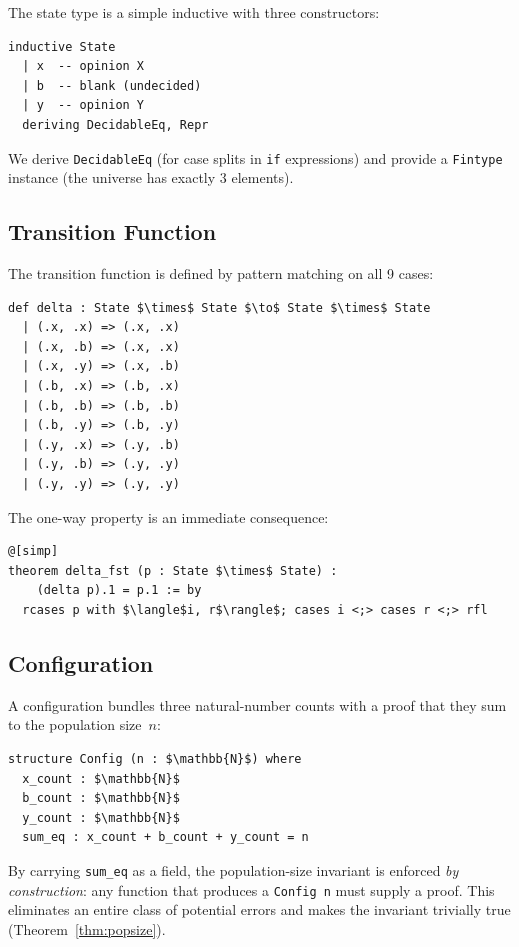 \documentclass[11pt,a4paper]{article}
\begin{document}
The state type is a simple inductive with three constructors:

\begin{lstlisting}
inductive State
  | x  -- opinion X
  | b  -- blank (undecided)
  | y  -- opinion Y
  deriving DecidableEq, Repr
\end{lstlisting}

We derive \texttt{DecidableEq} (for case splits in \texttt{if} expressions)
and provide a \texttt{Fintype} instance (the universe has exactly 3 elements).

\subsection{Transition Function}

The transition function is defined by pattern matching on all 9 cases:

\begin{lstlisting}
def delta : State $\times$ State $\to$ State $\times$ State
  | (.x, .x) => (.x, .x)
  | (.x, .b) => (.x, .x)
  | (.x, .y) => (.x, .b)
  | (.b, .x) => (.b, .x)
  | (.b, .b) => (.b, .b)
  | (.b, .y) => (.b, .y)
  | (.y, .x) => (.y, .b)
  | (.y, .b) => (.y, .y)
  | (.y, .y) => (.y, .y)
\end{lstlisting}

The one-way property is an immediate consequence:

\begin{lstlisting}
@[simp]
theorem delta_fst (p : State $\times$ State) :
    (delta p).1 = p.1 := by
  rcases p with $\langle$i, r$\rangle$; cases i <;> cases r <;> rfl
\end{lstlisting}

\subsection{Configuration}

A configuration bundles three natural-number counts with a proof that they
sum to the population size~$n$:

\begin{lstlisting}
structure Config (n : $\mathbb{N}$) where
  x_count : $\mathbb{N}$
  b_count : $\mathbb{N}$
  y_count : $\mathbb{N}$
  sum_eq : x_count + b_count + y_count = n
\end{lstlisting}

By carrying \texttt{sum\_eq} as a field, the population-size invariant is
enforced \emph{by construction}: any function that produces a
\texttt{Config n} must supply a proof.  This eliminates an entire class of
potential errors and makes the invariant trivially true (Theorem~\ref{thm:popsize}).
\end{document}
